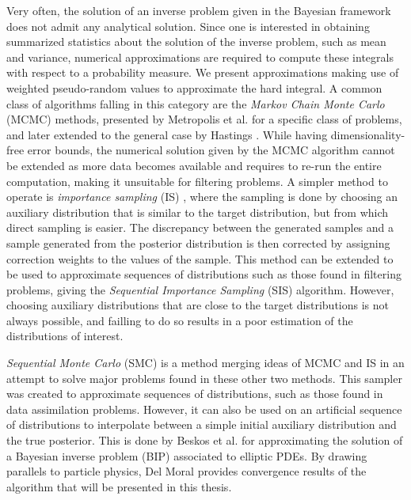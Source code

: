 Very often, the solution of an inverse problem given in the Bayesian framework does not admit any analytical solution. Since one is interested in obtaining summarized statistics about the solution of the inverse problem, such as mean and variance, numerical approximations are required to compute these integrals with respect to a probability measure. We present approximations making use of weighted pseudo-random values to approximate the hard integral. A common class of algorithms falling in this category are the \textit{Markov Chain Monte Carlo} (MCMC) methods, presented by Metropolis et al. \cite{metropolis1953equation} for a specific class of problems, and later extended to the general case by Hastings \cite{hastings1970monte}. While having dimensionality-free error bounds, the numerical solution given by the MCMC algorithm cannot be extended as more data becomes available and requires to re-run the entire computation, making it unsuitable for filtering problems. A simpler method to operate is \textit{importance sampling} (IS) \cite{Robert}, where the sampling is done by choosing an auxiliary distribution that is similar to the target distribution, but from which direct sampling is easier. The discrepancy between the generated samples and a sample generated from the posterior distribution is then corrected by assigning correction weights to the values of the sample. This method can be extended to be used to approximate sequences of distributions such as those found in filtering problems, giving the \textit{Sequential Importance Sampling} (SIS) algorithm. However, choosing auxiliary distributions that are close to the target distributions is not always possible, and failling to do so results in a poor estimation of the distributions of interest.

\textit{Sequential Monte Carlo} (SMC) \cite{del_moral_2006} is a method merging ideas of MCMC and IS in an attempt to solve major problems found in these other two methods. This sampler was created to approximate sequences of distributions, such as those found in data assimilation problems. However, it can also be used on an artificial sequence of distributions to interpolate between a simple initial auxiliary distribution and the true posterior. This is done by Beskos et al. \cite{beskos2015sequential} for approximating the solution of a Bayesian inverse problem (BIP) associated to elliptic PDEs. By drawing parallels to particle physics, Del Moral \cite{del2013mean, del2004feynman} provides convergence results of the algorithm that will be presented in this thesis.

